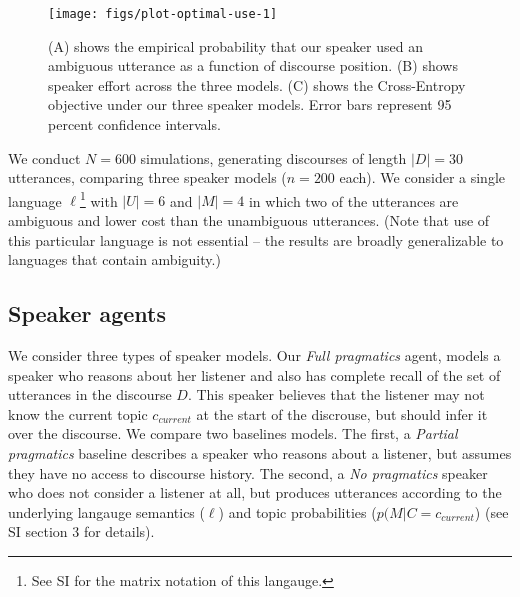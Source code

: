\documentclass[10pt, letterpaper]{article}
\newenvironment{CodeChunk}{}{}
\begin{document}
\begin{CodeChunk}
\begin{figure*}[h]

{\centering \texttt{[image: figs/plot-optimal-use-1]} 

}

\caption[(A) shows the empirical probability that our speaker used an ambiguous utterance as a function of discourse position]{(A) shows the empirical probability that our speaker used an ambiguous utterance as a function of discourse position. (B) shows speaker effort across the three models. (C) shows the Cross-Entropy objective under our three speaker models. Error bars represent 95 percent confidence intervals.}\label{fig:plot-optimal-use}
\end{figure*}
\end{CodeChunk}

We conduct \(N=600\) simulations, generating discourses of length
\(|D|=30\) utterances, comparing three speaker models (\(n=200\) each).
We consider a single language
\(\ell\)\footnote{See SI for the matrix notation of this langauge.} with
\(|U|=6\) and \(|M|=4\) in which two of the utterances are ambiguous and
lower cost than the unambiguous utterances. (Note that use of this
particular language is not essential -- the results are broadly
generalizable to languages that contain ambiguity.)\par

\subsection{Speaker agents}\label{speaker-agents}

We consider three types of speaker models. Our \textit{Full pragmatics}
agent, models a speaker who reasons about her listener and also has
complete recall of the set of utterances in the discourse \(D\). This
speaker believes that the listener may not know the current topic
\(c_{current}\) at the start of the discrouse, but should infer it over
the discourse. We compare two baselines models. The first, a
\textit{Partial pragmatics} baseline describes a speaker who reasons
about a listener, but assumes they have no access to discourse history.
The second, a \textit{No pragmatics} speaker who does not consider a
listener at all, but produces utterances according to the underlying
langauge semantics (\(\ell\)) and topic probabilities
(\(p(M|C=c_{current}\)) (see SI section 3 for details).\par
\end{document}
